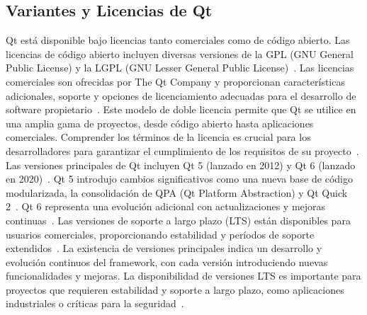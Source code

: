\subsection{Variantes y Licencias de Qt}
Qt está disponible bajo licencias tanto comerciales como de código abierto. Las licencias de código abierto incluyen diversas versiones de la GPL (GNU General Public License) y la LGPL (GNU Lesser General Public License)~\cite{qt_wiki}. Las licencias comerciales son ofrecidas por The Qt Company y proporcionan características adicionales, soporte y opciones de licenciamiento adecuadas para el desarrollo de software propietario~\cite{qt_wiki}. Este modelo de doble licencia permite que Qt se utilice en una amplia gama de proyectos, desde código abierto hasta aplicaciones comerciales. Comprender los términos de la licencia es crucial para los desarrolladores para garantizar el cumplimiento de los requisitos de su proyecto~\cite{qt_wiki}.
Las versiones principales de Qt incluyen Qt 5 (lanzado en 2012) y Qt 6 (lanzado en 2020)~\cite{qt_framework}. Qt 5 introdujo cambios significativos como una nueva base de código modularizada, la consolidación de QPA (Qt Platform Abstraction) y Qt Quick 2~\cite{qt_history}. Qt 6 representa una evolución adicional con actualizaciones y mejoras continuas~\cite{qt_framework}. Las versiones de soporte a largo plazo (LTS) están disponibles para usuarios comerciales, proporcionando estabilidad y períodos de soporte extendidos~\cite{qt_wiki}. La existencia de versiones principales indica un desarrollo y evolución continuos del framework, con cada versión introduciendo nuevas funcionalidades y mejoras. La disponibilidad de versiones LTS es importante para proyectos que requieren estabilidad y soporte a largo plazo, como aplicaciones industriales o críticas para la seguridad~\cite{lemberg}.

